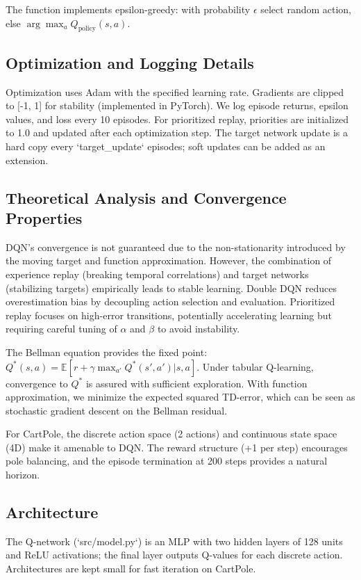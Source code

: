 \documentclass{IEEEtran}
\begin{document}
The  function implements epsilon-greedy: with probability $\epsilon$ select random action, else $\arg\max_a Q_{\text{policy}}(s, a)$.

\subsection{Optimization and Logging Details}

Optimization uses Adam with the specified learning rate. Gradients are clipped to [-1, 1] for stability (implemented in PyTorch). We log episode returns, epsilon values, and loss every 10 episodes. For prioritized replay, priorities are initialized to 1.0 and updated after each optimization step. The target network update is a hard copy every `target_update` episodes; soft updates can be added as an extension.
\subsection{Theoretical Analysis and Convergence Properties}

DQN's convergence is not guaranteed due to the non-stationarity introduced by the moving target and function approximation. However, the combination of experience replay (breaking temporal correlations) and target networks (stabilizing targets) empirically leads to stable learning. Double DQN reduces overestimation bias by decoupling action selection and evaluation. Prioritized replay focuses on high-error transitions, potentially accelerating learning but requiring careful tuning of $\alpha$ and $\beta$ to avoid instability.

The Bellman equation provides the fixed point: $Q^*(s,a) = \mathbb{E}[r + \gamma \max_{a'} Q^*(s',a') | s,a]$. Under tabular Q-learning, convergence to $Q^*$ is assured with sufficient exploration. With function approximation, we minimize the expected squared TD-error, which can be seen as stochastic gradient descent on the Bellman residual.

For CartPole, the discrete action space (2 actions) and continuous state space (4D) make it amenable to DQN. The reward structure (+1 per step) encourages pole balancing, and the episode termination at 200 steps provides a natural horizon.

\subsection{Architecture}

The Q-network (`src/model.py`) is an MLP with two hidden layers of 128 units and ReLU activations; the final layer outputs Q-values for each discrete action. Architectures are kept small for fast iteration on CartPole.
\end{document}
